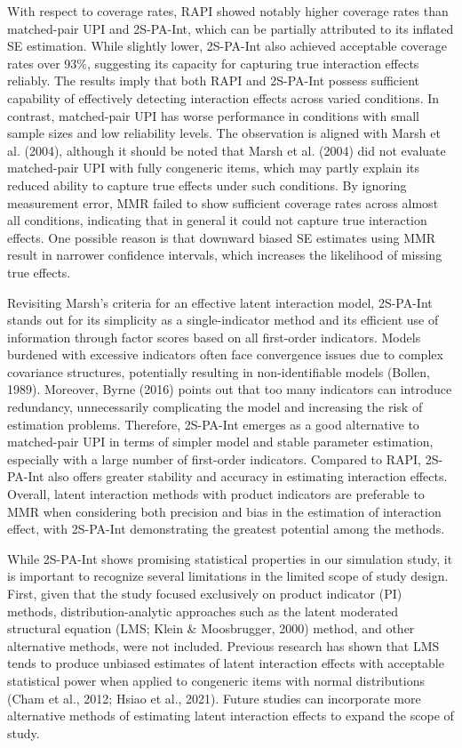 \documentclass[
  man,mask]{apa6}
\begin{document}
With respect to coverage rates, RAPI showed notably higher coverage rates than matched-pair UPI and 2S-PA-Int, which can be partially attributed to its inflated SE estimation. While slightly lower, 2S-PA-Int also achieved acceptable coverage rates over 93\%, suggesting its capacity for capturing true interaction effects reliably. The results imply that both RAPI and 2S-PA-Int possess sufficient capability of effectively detecting interaction effects across varied conditions. In contrast, matched-pair UPI has worse performance in conditions with small sample sizes and low reliability levels. The observation is aligned with Marsh et al. (2004), although it should be noted that Marsh et al. (2004) did not evaluate matched-pair UPI with fully congeneric items, which may partly explain its reduced ability to capture true effects under such conditions. By ignoring measurement error, MMR failed to show sufficient coverage rates across almost all conditions, indicating that in general it could not capture true interaction effects. One possible reason is that downward biased SE estimates using MMR result in narrower confidence intervals, which increases the likelihood of missing true effects.

Revisiting Marsh's criteria for an effective latent interaction model, 2S-PA-Int stands out for its simplicity as a single-indicator method and its efficient use of information through factor scores based on all first-order indicators. Models burdened with excessive indicators often face convergence issues due to complex covariance structures, potentially resulting in non-identifiable models (Bollen, 1989). Moreover, Byrne (2016) points out that too many indicators can introduce redundancy, unnecessarily complicating the model and increasing the risk of estimation problems. Therefore, 2S-PA-Int emerges as a good alternative to matched-pair UPI in terms of simpler model and stable parameter estimation, especially with a large number of first-order indicators. Compared to RAPI, 2S-PA-Int also offers greater stability and accuracy in estimating interaction effects. Overall, latent interaction methods with product indicators are preferable to MMR when considering both precision and bias in the estimation of interaction effect, with 2S-PA-Int demonstrating the greatest potential among the methods.

While 2S-PA-Int shows promising statistical properties in our simulation study, it is important to recognize several limitations in the limited scope of study design. First, given that the study focused exclusively on product indicator (PI) methods, distribution-analytic approaches such as the latent moderated structural equation (LMS; Klein \& Moosbrugger, 2000) method, and other alternative methods, were not included. Previous research has shown that LMS tends to produce unbiased estimates of latent interaction effects with acceptable statistical power when applied to congeneric items with normal distributions (Cham et al., 2012; Hsiao et al., 2021). Future studies can incorporate more alternative methods of estimating latent interaction effects to expand the scope of study.
\end{document}
